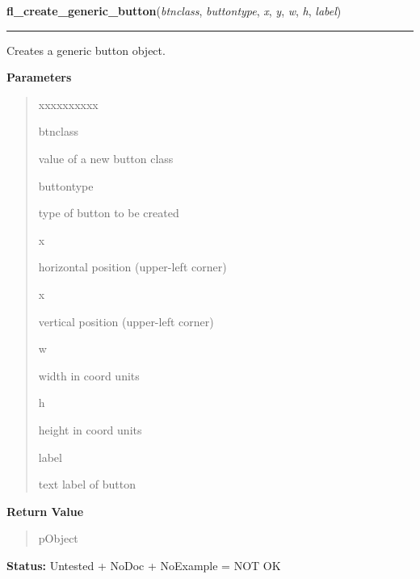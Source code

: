 \hspace{.8\funcindent}\begin{boxedminipage}{\funcwidth}

    \raggedright \textbf{fl\_create\_generic\_button}(\textit{btnclass}, \textit{buttontype}, \textit{x}, \textit{y}, \textit{w}, \textit{h}, \textit{label})

    \vspace{-1.5ex}

    \rule{\textwidth}{0.5\fboxrule}
\setlength{\parskip}{2ex}
    Creates a generic button object.

\setlength{\parskip}{1ex}
      \textbf{Parameters}
      \vspace{-1ex}

      \begin{quote}
        \begin{Ventry}{xxxxxxxxxx}

          \item[btnclass]

          value of a new button class

          \item[buttontype]

          type of button to be created

          \item[x]

          horizontal position (upper-left corner)

          \item[x]

          vertical position (upper-left corner)

          \item[w]

          width in coord units

          \item[h]

          height in coord units

          \item[label]

          text label of button

        \end{Ventry}

      \end{quote}

      \textbf{Return Value}
    \vspace{-1ex}

      \begin{quote}
      pObject

      \end{quote}

\textbf{Status:} Untested + NoDoc + NoExample = NOT OK



    \end{boxedminipage}

